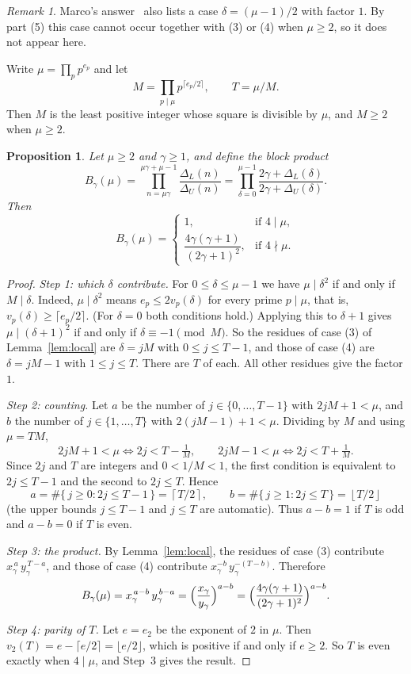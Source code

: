 \documentclass{amsart}
\newtheorem{proposition}[lemma]{Proposition}
\theoremstyle{definition}
\theoremstyle{remark}
\newtheorem{remark}{Remark}
\newcommand{\DL}{\Delta_L}
\newcommand{\DU}{\Delta_U}
\newcommand{\floor}[1]{\left\lfloor #1\right\rfloor}
\newcommand{\ceil}[1]{\left\lceil #1\right\rceil}
\begin{document}
\begin{remark}
Marco's answer~\cite{marco2025} also lists a case $\delta=(\mu-1)/2$ with factor $1$. By part (5) this case cannot occur together with (3) or (4) when $\mu\ge2$, so it does not appear here.
\end{remark}

Write $\mu=\prod_p p^{e_p}$ and let
\[
M=\prod_{p\mid\mu}p^{\lceil e_p/2\rceil},\qquad T=\mu/M .
\]
Then $M$ is the least positive integer whose square is divisible by $\mu$, and $M\ge2$ when $\mu\ge2$.

\begin{proposition}\label{prop:block}
Let $\mu\ge2$ and $\gamma\ge1$, and define the block product
\[
B_\gamma(\mu)=\prod_{n=\mu\gamma}^{\mu\gamma+\mu-1}\frac{\DL(n)}{\DU(n)}=\prod_{\delta=0}^{\mu-1}\frac{2\gamma+\DL(\delta)}{2\gamma+\DU(\delta)} .
\]
Then
\[
B_\gamma(\mu)=\begin{cases}1,&\text{if }4\mid\mu,\\[2pt] \dfrac{4\gamma(\gamma+1)}{(2\gamma+1)^2},&\text{if }4\nmid\mu.\end{cases}
\]
\end{proposition}

\begin{proof}
\emph{Step 1: which $\delta$ contribute.} For $0\le\delta\le\mu-1$ we have $\mu\mid\delta^2$ if and only if $M\mid\delta$. Indeed, $\mu\mid\delta^2$ means $e_p\le 2v_p(\delta)$ for every prime $p\mid\mu$, that is, $v_p(\delta)\ge\lceil e_p/2\rceil$. (For $\delta=0$ both conditions hold.) Applying this to $\delta+1$ gives $\mu\mid(\delta+1)^2$ if and only if $\delta\equiv-1\pmod M$. So the residues of case (3) of Lemma~\ref{lem:local} are $\delta=jM$ with $0\le j\le T-1$, and those of case (4) are $\delta=jM-1$ with $1\le j\le T$. There are $T$ of each. All other residues give the factor $1$.

\emph{Step 2: counting.} Let $a$ be the number of $j\in\{0,\dots,T-1\}$ with $2jM+1<\mu$, and $b$ the number of $j\in\{1,\dots,T\}$ with $2(jM-1)+1<\mu$. Dividing by $M$ and using $\mu=TM$,
\[
2jM+1<\mu\iff 2j<T-\tfrac1M,\qquad 2jM-1<\mu\iff 2j<T+\tfrac1M .
\]
Since $2j$ and $T$ are integers and $0<1/M<1$, the first condition is equivalent to $2j\le T-1$ and the second to $2j\le T$. Hence
\[
a=\#\{\,j\ge0:2j\le T-1\,\}=\ceil{T/2},\qquad b=\#\{\,j\ge1:2j\le T\,\}=\floor{T/2}
\]
(the upper bounds $j\le T-1$ and $j\le T$ are automatic). Thus $a-b=1$ if $T$ is odd and $a-b=0$ if $T$ is even.

\emph{Step 3: the product.} By Lemma~\ref{lem:local}, the residues of case (3) contribute $x_\gamma^{\,a}\,y_\gamma^{\,T-a}$, and those of case (4) contribute $x_\gamma^{-b}\,y_\gamma^{-(T-b)}$. Therefore
\[
B_\gamma(\mu)=x_\gamma^{\,a-b}\,y_\gamma^{\,b-a}=\Bigl(\frac{x_\gamma}{y_\gamma}\Bigr)^{a-b}=\Bigl(\frac{4\gamma(\gamma+1)}{(2\gamma+1)^2}\Bigr)^{a-b}.
\]

\emph{Step 4: parity of $T$.} Let $e=e_2$ be the exponent of $2$ in $\mu$. Then $v_2(T)=e-\lceil e/2\rceil=\lfloor e/2\rfloor$, which is positive if and only if $e\ge2$. So $T$ is even exactly when $4\mid\mu$, and Step~3 gives the result.
\end{proof}
\end{document}

